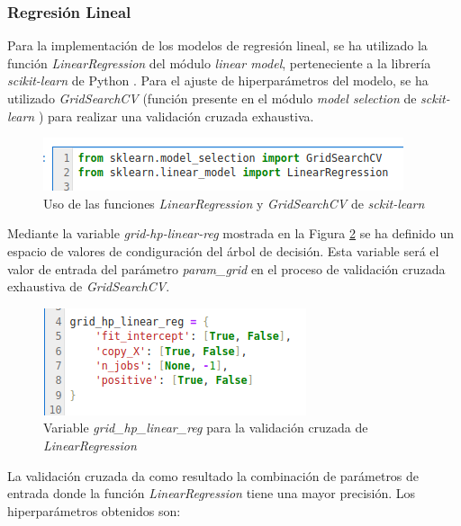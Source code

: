 \documentclass[12pt,a4paper,Spanish]{article}
\begin{document}
\subsubsection{Regresión Lineal}
Para la implementación de los modelos de regresión lineal, se ha utilizado la función \textit{LinearRegression} del módulo \textit{linear model}, perteneciente a la librería \textit{scikit-learn} de Python \cite{scikit-learn}.
\newline
Para el ajuste de hiperparámetros del modelo, se ha utilizado \textit{GridSearchCV} (función presente en el módulo \textit{model selection} de \textit{sckit-learn} \cite{scikit-learn}) para realizar una validación cruzada exhaustiva.
\begin{figure}[H]
	\centering
	\includegraphics[width=0.7\linewidth]{figs/import_linear_reg}
	\caption{Uso de las funciones \textit{LinearRegression} y \textit{GridSearchCV} de \textit{sckit-learn}}
	\label{fig:importlinearreg}
\end{figure}
Mediante la variable \textit{grid-hp-linear-reg} mostrada en la Figura \ref{fig:paramslinearreg} se ha definido un espacio de valores de condiguración del árbol de decisión. Esta variable será el valor de entrada del parámetro \textit{param\_grid} en el proceso de validación cruzada exhaustiva de \textit{GridSearchCV}.
\begin{figure}[H]
	\centering
	\includegraphics[width=0.7\linewidth]{figs/params_linear_reg}
	\caption{Variable \textit{grid\_hp\_linear\_reg} para la validación cruzada de \textit{LinearRegression}}
	\label{fig:paramslinearreg}
\end{figure}
La validación cruzada da como resultado la combinación de parámetros de entrada donde la función \textit{LinearRegression} tiene una mayor precisión. Los hiperparámetros obtenidos son:
\end{document}
